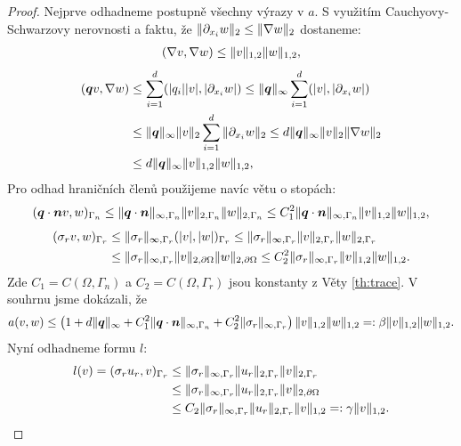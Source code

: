 \begin{proof}
Nejprve odhadneme postupně všechny výrazy v $a$.
S využitím Cauchyovy-Schwarzovy nerovnosti a faktu, že $\|\partial_{x_i} w\|_2\le\|\nabla w\|_2$ dostaneme:
\begin{align*}
(\nabla v,\nabla w) \le \|v\|_{1,2}\|w\|_{1,2},
\end{align*}
\begin{align*}
(\mathbf{\boldsymbol{q}} v,\nabla w)
&\le \sum_{i=1}^d(|q_i||v|,|\partial_{x_i}w|)
\le \|\mathbf{\boldsymbol{q}}\|_\infty\sum_{i=1}^d(|v|,|\partial_{x_i}w|)\\
&\le \|\mathbf{\boldsymbol{q}}\|_\infty\|v\|_2\sum_{i=1}^d\|\partial_{x_i}w\|_2
\le d\|\mathbf{\boldsymbol{q}}\|_\infty\|v\|_2\|\nabla w\|_2\\
&\le d\|\mathbf{\boldsymbol{q}}\|_\infty\|v\|_{1,2}\|w\|_{1,2},
\end{align*}
Pro odhad hraničních členů použijeme navíc větu o stopách:
\[ (\mathbf{\boldsymbol{q}}\cdot\mathbf{\boldsymbol{n}} v,w)_{\Gamma_n} \le \|\mathbf{\boldsymbol{q}}\cdot\mathbf{\boldsymbol{n}}\|_{\infty,\Gamma_n}\|v\|_{2,\Gamma_n}\|w\|_{2,\Gamma_n}
\le C_1^2\|\mathbf{\boldsymbol{q}}\cdot\mathbf{\boldsymbol{n}}\|_{\infty,\Gamma_n}\|v\|_{1,2}\|w\|_{1,2}, \]
\begin{align*}
(\sigma_r v,w)_{\Gamma_r}
&\le \|\sigma_r\|_{\infty,\Gamma_r}(|v|,|w|)_{\Gamma_r}
\le \|\sigma_r\|_{\infty,\Gamma_r}\|v\|_{2,\Gamma_r}\|w\|_{2,\Gamma_r}\\
&\le \|\sigma_r\|_{\infty,\Gamma_r}\|v\|_{2,\partial\Omega}\|w\|_{2,\partial\Omega}
\le C_2^2\|\sigma_r\|_{\infty,\Gamma_r}\|v\|_{1,2}\|w\|_{1,2}.
\end{align*}
Zde $C_1=C(\Omega,\Gamma_n)$ a $C_2=C(\Omega,\Gamma_r)$ jsou konstanty z Věty \ref{th:trace}.
V souhrnu jsme dokázali, že
\[ a(v,w) \le \left(1+d\|\mathbf{\boldsymbol{q}}\|_\infty+C_1^2\|\mathbf{\boldsymbol{q}}\cdot\mathbf{\boldsymbol{n}}\|_{\infty,\Gamma_n}+C_2^2\|\sigma_r\|_{\infty,\Gamma_r}\right)\|v\|_{1,2}\|w\|_{1,2} =: \beta \|v\|_{1,2}\|w\|_{1,2}. \]
Nyní odhadneme formu $l$:
\begin{align*}
l(v)=(\sigma_r u_r,v)_{\Gamma_r} & \le \|\sigma_r\|_{\infty,\Gamma_r}\|u_r\|_{2,\Gamma_r}\|v\|_{2,\Gamma_r}\\
&\le \|\sigma_r\|_{\infty,\Gamma_r}\|u_r\|_{2,\Gamma_r}\|v\|_{2,\partial\Omega}\\
&\le C_2\|\sigma_r\|_{\infty,\Gamma_r}\|u_r\|_{2,\Gamma_r}\|v\|_{1,2} =:\gamma\|v\|_{1,2}.
\end{align*}
\end{proof}


